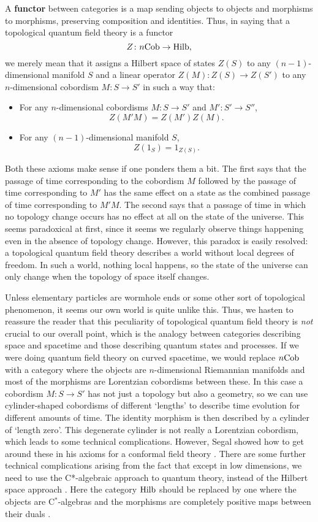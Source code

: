 \documentclass{article}
\newcommand{\Hilb}{{\rm Hilb}}
\newcommand{\Cob}{{\rm Cob}}
\renewcommand{\to}{\rightarrow}
\newcommand{\maps}{\colon}
\begin{document}
A {\bf functor} between categories is a map sending objects to objects
and morphisms to morphisms, preserving composition and identities.  Thus, 
in saying that a topological quantum field theory is a functor
\[            Z \maps n\Cob \to \Hilb  , \]
we merely mean that it assigns a Hilbert space of states $Z(S)$ to 
any $(n-1)$-dimensional manifold $S$ and a linear operator 
$Z(M) \maps Z(S) \to Z(S')$ to any $n$-dimensional cobordism 
$M \maps S \to S'$ in such a way that:
\begin{itemize}
\item For any $n$-dimensional cobordisms 
$M \maps S \to S'$ and $M' \maps S' \to S''$, 
\[                Z(M'M) = Z(M')Z(M) .  \]
\item For any $(n-1)$-dimensional manifold $S$, 
\[                Z(1_S) = 1_{Z(S)}  .\] 
\end{itemize} 
Both these axioms make sense if one ponders them a bit. 
The first says that the passage of time corresponding to the cobordism 
$M$ followed by the passage of time corresponding to $M'$ has the  same
effect on a state as the combined passage of time corresponding to
$M'M$.  The second says that a passage of time in which no topology 
change occurs has no effect at all on the state of the universe.  This
seems paradoxical at first, since it seems we regularly observe things 
happening even in the absence of topology change.   However, this
paradox is easily resolved: a topological quantum field theory describes 
a world without local degrees of freedom.   In 
such a world, nothing local happens, so the state of the universe can 
only change when the topology of space itself changes.  

Unless elementary particles are wormhole ends or some other sort
of topological phenomenon, it seems our own world is quite unlike 
this.  Thus, we hasten to reassure the 
reader that this peculiarity of topological quantum field theory is 
{\it not} crucial to our overall point, which is the analogy between 
categories describing space and spacetime and those describing quantum 
states and processes.  If we were doing quantum field theory on curved 
spacetime, we would replace $n\Cob$ with a category where the objects 
are $n$-dimensional Riemannian manifolds and most of the morphisms are 
Lorentzian cobordisms between these.  In this case a cobordism 
$M \maps S \to S'$ has not just a topology but also a geometry, so we 
can use cylinder-shaped cobordisms of different `lengths' to describe 
time evolution for different amounts of time.  The identity morphism 
is then described by a cylinder of `length zero'.  This degenerate
cylinder is not really a Lorentzian cobordism, which leads to some 
technical complications.  However, Segal showed how to get around these
in his axioms for a conformal field theory \cite{Segal}.  There are 
some further technical complications arising from the fact that except 
in low dimensions, we need to use the C*-algebraic approach to quantum 
theory, instead of the Hilbert space approach \cite{Earman}.  Here the
category $\Hilb$ should be replaced by one where the objects are 
C$^*$-algebras and the morphisms are completely positive maps between
their duals \cite{HMS}.
\end{document}
